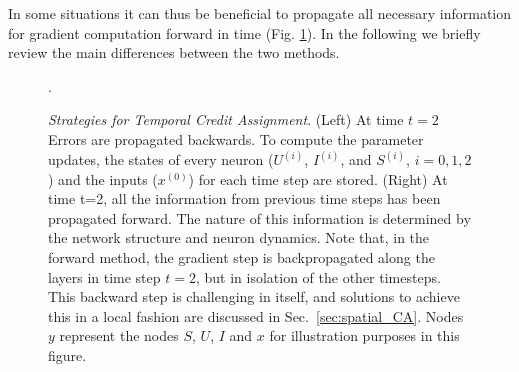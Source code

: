 \documentclass[journal,onecolumn,11pt]{IEEEtran}
\begin{document}
In some situations it can thus be beneficial to propagate all necessary information for gradient computation forward in time \cite{Williams_Zipser89_learalgo} (Fig. \ref{fig:backwrd_vs_forward_prop}).
In the following we briefly review the main differences between the two methods.
%
\begin{figure}[htbp]
    \centering
  \caption{\emph{Strategies for Temporal Credit Assignment}. (Left) At time $t=2$ Errors are propagated backwards. To compute the parameter updates, the states of every neuron ($U^{(i)}$, $I^{(i)}$, and $S^{(i)}$, $i=0,1,2$) and the inputs ($x^{(0)}$) for each time step are stored. (Right) At time t=2, all the information from previous time steps has been propagated forward. The nature of this information is determined by the network structure and neuron dynamics. Note that, in the forward method, the gradient step is backpropagated along the layers in time step $t=2$, but in isolation of the other timesteps. This backward step is challenging in itself, and solutions to achieve this in a local fashion are discussed in Sec.~\ref{sec:spatial_CA}. Nodes $y$ represent the nodes $S$, $U$, $I$ and $x$ for illustration purposes in this figure.
}. 
    \label{fig:backwrd_vs_forward_prop}
\end{figure}
%
\end{document}
